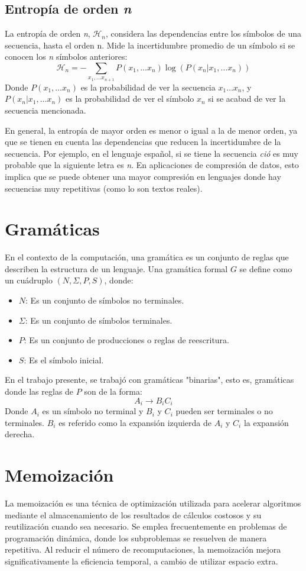 \subsection{Entropía de orden \textit{n}}
La entropía de orden \textit{n}, $\mathcal{H}_n$, considera las dependencias entre los símbolos de una secuencia, hasta el orden n. Mide la incertidumbre promedio de un símbolo si se conocen los \textit{n} símbolos anteriores:
\[
\mathcal{H}_{n} = - \sum_{x_{1}, \ldots x_{n+1}} P(x_1, \ldots x_n) \log(P(x_n | x_1, \ldots x_n))
\]
Donde $P(x_1, \ldots x_n)$ es la probabilidad de ver la secuencia $x_1 \ldots x_n$, y $P(x_n | x_1, \ldots x_n)$ es la probabilidad de ver el símbolo $x_n$ si se acabad de ver la secuencia mencionada. 

En general, la entropía de mayor orden es menor o igual a la de menor orden, ya que se tienen en cuenta las dependencias que reducen la incertidumbre de la secuencia. Por ejemplo, en el lenguaje español, si se tiene la secuencia \textit{ció} es muy probable que la siguiente letra es \textit{n}.  En aplicaciones de compresión de datos, esto implica que se puede obtener una mayor compresión en lenguajes donde hay secuencias muy repetitivas (como lo son textos reales).

\section{Gramáticas}
En el contexto de la computación, una gramática es un conjunto de reglas que describen 
la estructura de un lenguaje. Una gramática formal $G$ se define como un cuádruplo $(N, \Sigma, P, S)$, donde:
\begin{itemize}
    \item $N$: Es un conjunto de símbolos no terminales.
    \item $\Sigma$: Es un conjunto de símbolos terminales.
    \item $P$: Es un conjunto de producciones o reglas de reescritura.
    \item $S$: Es el símbolo inicial.
\end{itemize}

En el trabajo presente, se trabajó con gramáticas "binarias", esto es, gramáticas donde las reglas de $P$ son de la forma:
\[
A_i \rightarrow B_i C_i
\]
Donde $A_i$ es un símbolo no terminal y $B_i$ y $C_i$ pueden ser terminales o no terminales. $B_i$ es referido como la expansión izquierda de $A_i$ y $C_i$ la expansión derecha.

\section{Memoización}
La memoización es una técnica de optimización utilizada para acelerar algoritmos 
mediante el almacenamiento de los resultados de cálculos costosos y su reutilización 
cuando sea necesario. Se emplea frecuentemente en problemas de programación dinámica, 
donde los subproblemas se resuelven de manera repetitiva. Al reducir el número de 
recomputaciones, la memoización mejora significativamente la eficiencia temporal, a cambio de utilizar espacio extra.

